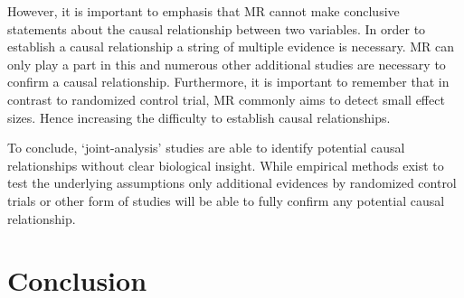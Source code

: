 However, it is important to emphasis that MR cannot make conclusive statements about the causal relationship between two variables.
In order to establish a causal relationship a string of multiple evidence is necessary.
MR can only play a part in this and numerous other additional studies are necessary to confirm a causal relationship.
Furthermore, it is important to remember that in contrast to randomized control trial, MR commonly aims to detect small effect sizes.
Hence increasing the difficulty to establish causal relationships. 

To conclude, `joint-analysis' studies are able to identify potential causal relationships without clear biological insight.
While empirical methods exist to test the underlying assumptions only additional evidences by randomized control trials or other form of studies will be able to fully confirm any potential causal relationship.

\section{Conclusion}
\label{sec:conclusion}


